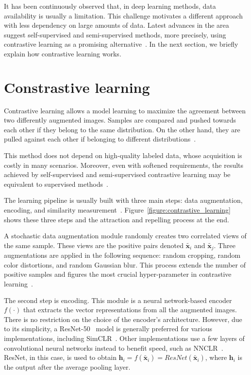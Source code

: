\documentclass[12pt]{article}
\begin{document}
It has been continuously observed that, in deep learning methods, data availability is usually a limitation. This challenge motivates a different approach with less dependency on large amounts of data. Latest advances in the area suggest self-supervised and semi-supervised methods, more precisely, using contrastive learning as a promising alternative~\cite{guldenring2021}. %
In the next section, we briefly explain how contrastive learning works.

\section{Constrastive learning}\label{section:constrastive-learning}

Contrastive learning allows a model learning to maximize the agreement between two differently augmented images. Samples are compared and pushed towards each other if they belong to the same distribution. On the other hand, they are pulled against each other if belonging to different distributions~\cite{chen2020}.

This method does not depend on high-quality labeled data, whose acquisition is costly in many scenarios. Moreover, even with softened requirements, the results achieved by self-supervised and semi-supervised contrastive learning may be equivalent to supervised methods~\citep{chen2020}.

The learning pipeline is usually built with three main steps: data augmentation, encoding, and similarity measurement~\citep{ashish2020}. Figure~\ref{figure:contrastive_learning} shows these three steps and the attraction and repelling process at the end.

A stochastic data augmentation module randomly creates two correlated views of the same sample. These views are the positive pairs denoted ${\tilde{\boldsymbol{x}_i}}$ and $\tilde{\boldsymbol{x}_j}$. Three augmentations are applied in the following sequence: random cropping, random color distortions, and random Gaussian blur. This process extends the number of positive samples and figures the most crucial hyper-parameter in contrastive learning~\citep{chen2020}.

The second step is encoding. This module is a neural network-based encoder $f(\cdot)$ that extracts the vector representations from all the augmented images. There is no restriction on the choice of the encoder's architecture. However, due to its simplicity, a ResNet-50~\citep{zhang2016} model is generally preferred for various implementations, including SimCLR~\citep{chen2020}. Other implementations use a few layers of convolutional neural networks instead to benefit speed, such as NNCLR~\citep{dwibedi2021}. ResNet, in this case, is used to obtain $ \boldsymbol{h}_i=f(\tilde{\boldsymbol{x}_i})=ResNet(\tilde{\boldsymbol{x}_i})$, where $\boldsymbol{h}_i$ is the output after the average pooling layer.
\end{document}
